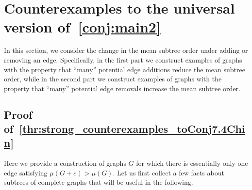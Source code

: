 \documentclass[11pt]{article}
\theoremstyle{definition}
\begin{document}
\section{Counterexamples to the universal version of~\cref{conj:main2}}\label{sec:nonuniversal}

In this section, we consider the change in the mean subtree order under adding or removing an edge. Specifically, in the first part we construct examples of graphs with the property that ``many'' potential edge additions reduce the mean subtree order, while in the second part we construct examples of graphs with the property that ``many'' potential edge removals increase the mean subtree order.

\subsection{Proof of~\cref{thr:strong_counterexamples_toConj7.4Chin}}

Here we provide a construction of graphs $G$ for which there is essentially only one edge satisfying $\mu(G+e)>\mu(G).$
Let us first collect a few facts about subtrees of complete graphs that will be useful in the following.
\end{document}
